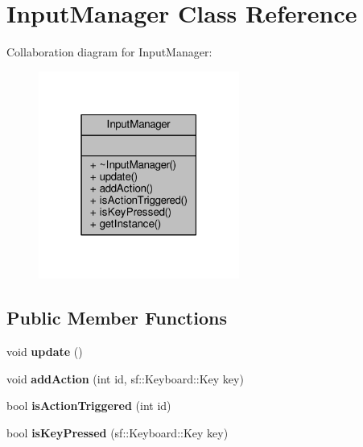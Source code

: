 \hypertarget{class_input_manager}{}\section{Input\+Manager Class Reference}
\label{class_input_manager}


Collaboration diagram for Input\+Manager\+:\nopagebreak
\begin{figure}[H]
\begin{center}
\leavevmode
\includegraphics[width=187pt]{d9/d3f/class_input_manager__coll__graph}
\end{center}
\end{figure}
\subsection*{Public Member Functions}
\begin{DoxyCompactItemize}
\item 
void {\bfseries update} ()\hypertarget{class_input_manager_a136d6afa55ee74eeda5eb72e78e3ee97}{}\label{class_input_manager_a136d6afa55ee74eeda5eb72e78e3ee97}

\item 
void {\bfseries add\+Action} (int id, sf\+::\+Keyboard\+::\+Key key)\hypertarget{class_input_manager_a8eb93ac62bee7cdb829336a008478fe9}{}\label{class_input_manager_a8eb93ac62bee7cdb829336a008478fe9}

\item 
bool {\bfseries is\+Action\+Triggered} (int id)\hypertarget{class_input_manager_a7e83a8c47ea5e3dab7a6f1156cf35e96}{}\label{class_input_manager_a7e83a8c47ea5e3dab7a6f1156cf35e96}

\item 
bool {\bfseries is\+Key\+Pressed} (sf\+::\+Keyboard\+::\+Key key)\hypertarget{class_input_manager_ae4eb5b4e26a46904736cf37173aaf260}{}\label{class_input_manager_ae4eb5b4e26a46904736cf37173aaf260}

\end{DoxyCompactItemize}
